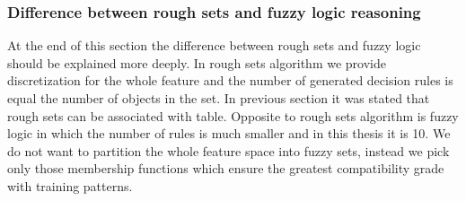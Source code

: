 \subsubsection{Difference between rough sets and fuzzy logic reasoning}
\label{cha:Difference}
At the end of this section the difference between rough sets and fuzzy logic should 
be explained more deeply. In rough sets algorithm we provide discretization for the 
whole feature and the number of generated decision rules is equal the number of objects 
in the set. In previous section it was stated that rough sets can be associated with table. 
Opposite to rough sets algorithm is fuzzy logic in which the number of rules is much smaller 
and in this thesis it is 10. We do not want to partition the whole feature space into fuzzy 
sets, instead we pick only those membership functions which ensure the greatest compatibility 
grade with training patterns.
